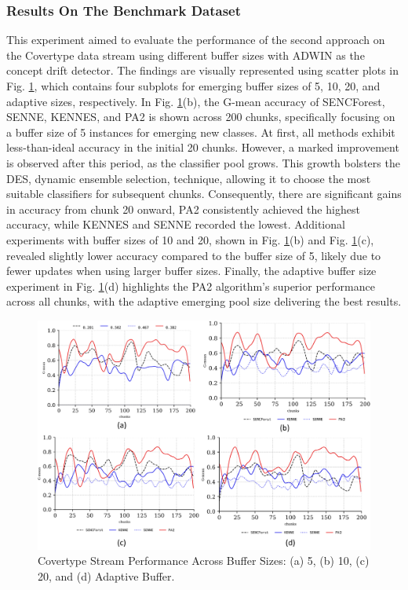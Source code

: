 \subsubsection{Results On The Benchmark Dataset}
\label{sec:covertype}
This experiment aimed to evaluate the performance of the second approach on the Covertype data stream using different buffer sizes with ADWIN as the concept drift detector. The findings are visually represented using scatter plots in Fig. \ref{fig:res1}, which contains four subplots for emerging buffer sizes of 5, 10, 20, and adaptive sizes, respectively. In Fig. \ref{fig:res1}(b), the G-mean accuracy of SENCForest, SENNE, KENNES, and PA2 is shown across 200 chunks, specifically focusing on a buffer size of 5 instances for emerging new classes. At first, all methods exhibit less-than-ideal accuracy in the initial 20 chunks. However, a marked improvement is observed after this period, as the classifier pool grows. This growth bolsters the DES, dynamic ensemble selection, technique, allowing it to choose the most suitable classifiers for subsequent chunks. Consequently, there are significant gains in accuracy from chunk 20 onward, PA2 consistently achieved the highest accuracy, while KENNES and SENNE recorded the lowest. Additional experiments with buffer sizes of 10 and 20, shown in Fig. \ref{fig:res1}(b) and Fig. \ref{fig:res1}(c), revealed slightly lower accuracy compared to the buffer size of 5, likely due to fewer updates when using larger buffer sizes. Finally, the adaptive buffer size experiment in Fig. \ref{fig:res1}(d) highlights the PA2 algorithm's superior performance across all chunks, with the adaptive emerging pool size delivering the best results.

\begin{figure}[!ht]
	\centering
	\includegraphics[width=1\linewidth]{5_Emerging/images/res1.png}
	\caption{Covertype Stream Performance Across Buffer Sizes: (a) 5, (b) 10, (c) 20, and (d) Adaptive Buffer.}

	\label{fig:res1}
\end{figure}				

